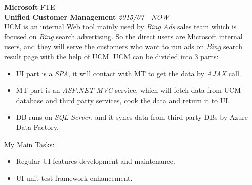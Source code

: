 \documentclass[a4paper]{article}
\newenvironment{changemargin}[2]{%
  \begin{list}{}{%
    \setlength{\topsep}{0pt}%
    \setlength{\leftmargin}{#1}%
    \setlength{\rightmargin}{#2}%
    \setlength{\listparindent}{\parindent}%
    \setlength{\itemindent}{\parindent}%
    \setlength{\parsep}{\parskip}%
  }%
  \item[]}{\end{list}
}
\newenvironment{body} {
	\vspace*{-16pt}
	\begin{changemargin}{-0.25in}{-0.5in}
  }	
	{\end{changemargin}
}
\begin{document}
\begin{body}
	\vspace{14pt}
	\textbf{Microsoft} \hfill FTE\\ 
	\textbf{Unified Customer Management} \hfill \emph{2015/07 - NOW}\\ 
	UCM is an internal Web tool mainly used by \emph{Bing Ads} sales team which is focused on \emph{Bing} search advertising. So the direct users are Microsoft internal users, and they will serve the customers who want to run ads on \emph{Bing} search result page with the help of UCM. UCM can be divided into 3 parts:\\
	\vspace*{-4pt}
	\begin{itemize} \itemsep -0pt  %
		\item UI part is a \emph{SPA}, it will contact with MT to get the data by  \emph{AJAX} call.\\
	\end{itemize}
	\vspace*{-12pt}
	\begin{itemize} \itemsep -0pt  %
		\item MT part is an \emph{ASP.NET MVC} service, which will fetch data from UCM database and third party services, cook the data and return it to UI.\\
	\end{itemize}
	\vspace*{-12pt}
	\begin{itemize} \itemsep -0pt  %
		\item DB runs on \emph{SQL Server}, and it syncs data from third party DBs by Azure Data Factory.\\
	\end{itemize}
	\vspace*{-4pt}
	My Main Tasks:\\
	\vspace*{-4pt}
	\begin{itemize} \itemsep -0pt  %
		\item Regular UI features development and maintenance.\\
	\end{itemize}
	\vspace*{-12pt}
	\begin{itemize} \itemsep -0pt  %
		\item UI unit test framework enhancement.\\

\end{itemize}
\end{body}
\end{document}
